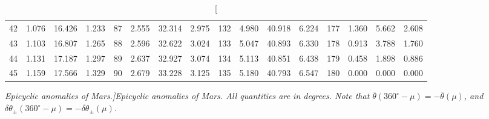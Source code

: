 \begin{table}
{\begin{tabular}{rrrr|rrrr|rrrr|rrrr}
 42 & \tiny{  1.076} &  16.426 & \tiny{  1.233} &  87 & \tiny{  2.555} &  32.314 & \tiny{  2.975} & 132 & \tiny{  4.980} &  40.918 & \tiny{  6.224} & 177 & \tiny{  1.360} &   5.662 & \tiny{  2.608}\\
 43 & \tiny{  1.103} &  16.807 & \tiny{  1.265} &  88 & \tiny{  2.596} &  32.622 & \tiny{  3.024} & 133 & \tiny{  5.047} &  40.893 & \tiny{  6.330} & 178 & \tiny{  0.913} &   3.788 & \tiny{  1.760}\\
 44 & \tiny{  1.131} &  17.187 & \tiny{  1.297} &  89 & \tiny{  2.637} &  32.927 & \tiny{  3.074} & 134 & \tiny{  5.113} &  40.851 & \tiny{  6.438} & 179 & \tiny{  0.458} &   1.898 & \tiny{  0.886}\\
 45 & \tiny{  1.159} &  17.566 & \tiny{  1.329} &  90 & \tiny{  2.679} &  33.228 & \tiny{  3.125} & 135 & \tiny{  5.180} &  40.793 & \tiny{  6.547} & 180 & \tiny{  0.000} &   0.000 & \tiny{  0.000}\\ 
\end{tabular}}
\caption[\em Epicyclic anomalies of Mars.]{\em Epicyclic anomalies of Mars. All quantities are in degrees. Note that $\bar{\theta}(360^\circ-\mu) = -\bar{\theta}(\mu)$, and $\delta\theta_{\pm}(360^\circ-\mu) = -\delta\theta_{\pm}(\mu)$. }\label{vt10}
\end{table}

